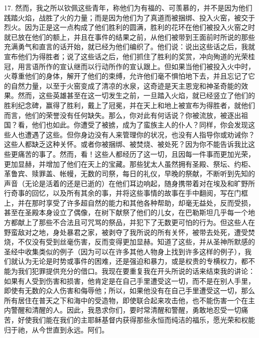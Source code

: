 17. 然而，我之所以钦佩这些青年，称他们为有福的、可羡慕的，并不是因为他们践踏火焰，战胜了火的力量；而是因为他们为了真道而被捆绑、投入火窑，被交于烈火。因为正是这一点构成了他们胜利的圆满，胜利的花环在他们被投入火窑之时就已放在他们的额上，并且在事件的结果之前，从他们被带到王面前时所说的那些充满勇气和直言的话开始，就已经为他们编织了。他们说：说出这些话之后，我就宣布他们为得胜者；说了这些话之后，他们抓住了胜利的奖赏，冲向殉道的光荣桂冠，用言语所作的宣认继而以行动所作的宣认跟上。但如果当他们被投入火中时，火尊重他们的身体，解开了他们的束缚，允许他们毫不惧怕地下去，并且忘记了它的自然力量，以至于火窑变成了清凉的水泉，这奇迹是天主恩宠和神圣奇能的效果。然而，这些英雄甚至在这一切发生之前，一旦踏入火焰，就已经竖立了他们的胜利纪念碑，赢得了胜利，戴上了冠冕，并在天上和地上被宣布为得胜者，就他们而言，他们的荣誉没有任何缺失。那么，你对此有何话说？你被流放，被逐出祖国？看，他们也如此。你遭受了被掳，成为了蛮族主人的仆人？同样，你会发现这些人也遭遇了这些。但你身边没有人来管理你的状况，也没有人指导你或劝诫你？这些人都缺乏这种关怀。或者你被捆绑、被焚烧、被处死？因为你不能告诉我比这些更痛苦的事了。然而，看！这些人都经历了这一切，且因每一件事而更加光荣，更加显赫，并增加了他们在天上的宝藏。那些犹太人虽然拥有圣殿、祭坛、约柜、革鲁宾、赎罪盖、帐幔，无数的司祭，每日的礼仪，早晚的祭献，不断听到先知的声音（无论是活着的还是已逝的）在他们耳边响起，随身携带着对在埃及和旷野所行奇事的回忆，以及所有其余的事，并将这些事情的故事在手中翻阅，写在门框上，并在那时享受了许多超自然的能力和其他各种帮助，却毫无益处，反而受损，甚至在圣殿本身设立了偶像，在树下献祭了他们的儿女，在巴勒斯坦几乎每一个地方都献上了那些不合法且可咒骂的祭品，并犯下了无数更可怕的行为。但这些人在野蛮敌对之地，身处暴君之家，被剥夺了我所说的所有关怀，被带去处死，遭受焚烧，不仅没有受到丝毫伤害，反而变得更加显赫。知道了这些，并从圣神所默感的圣经中收集类似的例子（因为可以在许多其他人物身上找到许多这样的例子），我们就认为无论是时势或事件的困难，还是强迫和暴力，或是权贵的专横权力，都不能为我们犯罪提供充分的借口。我现在要重复我在开头所说的话来结束我的讲论：如果有人受到伤害和损害，他肯定是在自己手里遭受这一切，而不是在别人手里，即使有无数的众人伤害和侮辱他；所以，如果他没有在自己手里遭受这一切，那么所有居住在普天之下和海中的受造物，即使联合起来攻击他，也不能伤害一个在主内警醒和清醒的人。因此，我恳求你们，要时常清醒和警醒，勇敢地忍受一切痛苦，好使我们能在我们的主耶稣基督内获得那些永恒而纯洁的福乐，愿光荣和权能归于祂，从今世直到永远。阿们。\par


